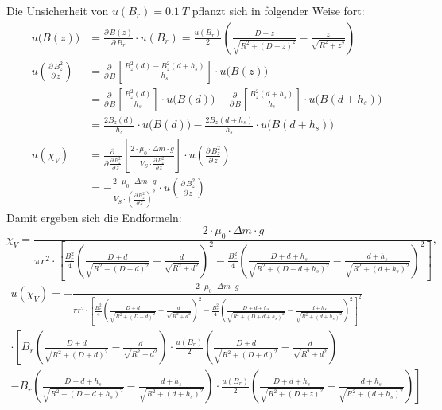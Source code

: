 \documentclass[11pt,a4paper,titlepage, ngerman]{article}
\begin{document}
			Die Unsicherheit von $u(B_r) = \SI{0,1}{T}$ pflanzt sich in folgender Weise fort:
			\begin{align}
				u\big(B(z)\big) &= \frac{\partial\,B(z)}{\partial\,B_r} \cdot u(B_r) = \frac{u(B_r)}{2}\left( \frac{D+z}{\sqrt{R^2 + (D+z)^2}} - \frac{z}{\sqrt{R^2 + z^2}}\right)\\
				u\left( \frac{\partial\,B^2_z}{\partial\,z}\right)
				&= \frac{\partial\,}{\partial\,B}\left[ \frac{B_z^2(d) - B_z^2(d+h_s)}{h_s}\right]  \cdot u\big(B(z)\big)\\
				&= \frac{\partial\,}{\partial\,B} \left[ \frac{B_z^2(d)}{h_s}\right]  \cdot u\big(B(d)\big) - \frac{\partial\,}{\partial\,B} \left[ \frac{ B_z^2(d+h_s)}{h_s}\right]  \cdot u\big(B(d+h_s)\big)\\
				&= \frac{2B_z(d)}{h_s} \cdot u\big(B(d)\big) - \frac{2B_z(d+h_s)}{h_s} \cdot u\big(B(d+h_s)\big)\\
				u\left( \chi_V\right) &= \frac{\partial\,}{\partial\,\frac{\partial\,B_z^2}{\partial\,z}} \left[ \frac{2 \cdot \mu_0 \cdot \Delta m \cdot g}{V_S \cdot \frac{\partial\,B_z^2}{\partial\,z}}\right] \cdot u\left( \frac{\partial\,B_z^2}{\partial\,z}\right) \\
				&= - \frac{2 \cdot \mu_0 \cdot \Delta m \cdot g}{V_S \cdot \left( \frac{\partial\,B_z^2}{\partial\,z}\right) ^2} \cdot u\left( \frac{\partial\,B_z^2}{\partial\,z}\right)
			\end{align}
			Damit ergeben sich die Endformeln:
			\begin{equation}
				\chi_V = \frac{2 \cdot \mu_0 \cdot \Delta m \cdot g}{\pi r^2 \cdot \left[ \frac{B_r^2}{4}\left( \frac{D+d}{\sqrt{R^2 + (D+d)^2}} - \frac{d}{\sqrt{R^2 + d^2}}\right)^2 - \frac{B_r^2}{4}\left( \frac{D+d+h_s}{\sqrt{R^2 + (D+d+h_s)^2}} - \frac{d+h_s}{\sqrt{R^2 + (d+h_s)^2}}\right)^2\right] },
			\end{equation}
			\begin{align}
				u(\chi_V) = - \frac{2 \cdot \mu_0 \cdot \Delta m \cdot g}{\pi r^2 \cdot \left[ \frac{B_r^2}{4}\left( \frac{D+d}{\sqrt{R^2 + (D+d)^2}} - \frac{d}{\sqrt{R^2 + d^2}}\right)^2 - \frac{B_r^2}{4}\left( \frac{D+d+h_s}{\sqrt{R^2 + (D+d+h_s)^2}} - \frac{d+h_s}{\sqrt{R^2 + (d+h_s)^2}}\right)^2\right] ^2}\\
				\cdot \left[ B_r \left( \frac{D+d}{\sqrt{R^2 + (D+d)^2}} - \frac{d}{\sqrt{R^2 + d^2}}\right) \cdot \frac{u(B_r)}{2}\left( \frac{D+d}{\sqrt{R^2 + (D+d)^2}} - \frac{d}{\sqrt{R^2 + d^2}}\right)\right.\\
				- \left. B_r\left( \frac{D+d+h_s}{\sqrt{R^2 + (D+d+h_s)^2}} - \frac{d+h_s}{\sqrt{R^2 + (d+h_s)^2}}\right) \cdot \frac{u(B_r)}{2}\left( \frac{D+d+h_s}{\sqrt{R^2 + (D+z)^2}} - \frac{d+h_s}{\sqrt{R^2 + (d+h_s)^2}}\right)\right] 
			\end{align}
				
\end{document}
